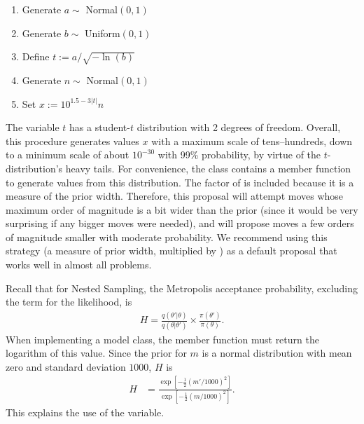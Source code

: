 \documentclass[article, nojss]{jss}
\newcommand{\params}{\theta}
\begin{document}
\begin{enumerate}
\item Generate $a \sim$ Normal$(0, 1)$
\item Generate $b \sim$ Uniform$(0, 1)$
\item Define $t := a/\sqrt{-\ln(b)}$
\item Generate $n \sim$ Normal$(0, 1)$
\item Set $x := 10^{1.5 - 3|t|}n$
\end{enumerate}
The variable $t$ has a student-$t$ distribution with 2 degrees of freedom.
Overall, this procedure generates values $x$
with a maximum scale of tens--hundreds, down to
a minimum scale of about $10^{-30}$ with 99\% probability, by virtue
of the $t$-distribution's heavy tails.
For convenience, the  class contains a member function 
to generate values from this distribution.
The factor of  is included because it is a measure of the prior
width. Therefore, this proposal will attempt moves whose maximum order of
magnitude is a bit wider than the prior (since it would be very surprising
if any bigger moves were needed), and will propose moves a few orders of
magnitude smaller with moderate probability. We recommend using
this strategy (a measure of prior width, multiplied by ) as
a default proposal that works well in almost all problems.

Recall that for Nested Sampling, the Metropolis acceptance probability,
excluding the term for the likelihood, is
\begin{align}
H = \frac{q(\params'|\params)}{q(\params | \params')}
\times \frac{\pi(\params')}{\pi(\params)}.
\end{align}
When implementing a model class, the
member function must return the logarithm of this value.
Since the prior for $m$ is a normal distribution with
mean zero and standard deviation $1000$, $H$ is
\begin{align}
H &= \frac{\exp\left[-\frac{1}{2}(m'/1000)^2\right]}
{\exp\left[-\frac{1}{2}(m/1000)^2\right]}.
\end{align}
This explains the use of the  variable.
\end{document}
